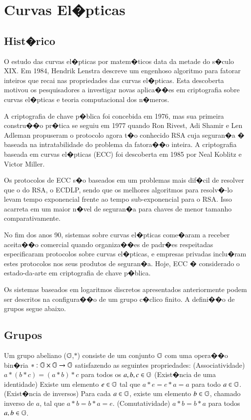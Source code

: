\documentclass[a4paper,capchap,espacoduplo,normaltoc]{abntepusp}
\begin{document}
\section{Curvas El�pticas}

\subsection{Hist�rico}
O estudo das curvas el�pticas por matem�ticos data da metade do s�culo XIX. Em 1984, Hendrik Lenstra\cite{lenstra} descreve um engenhoso algoritmo para fatorar inteiros que recai nas propriedades das curvas el�pticas. Esta descoberta motivou os pesquisadores a investigar novas aplica��es em criptografia sobre curvas el�pticas e teoria computacional dos n�meros.

A criptografia de chave p�blica foi concebida em 1976, mas sua primeira constru��o pr�tica se seguiu em 1977 quando Ron Rivest, Adi Shamir e Len Adleman propuseram o protocolo agora t�o conhecido RSA \cite{rsa} cuja seguran�a � baseada na intratabilidade do problema da fatora��o inteira. A criptografia baseada em curvas el�pticas (ECC) foi descoberta em 1985 por Neal Koblitz e Victor Miller.

Os protocolos de ECC s�o baseados em um problemas mais dif�cil de resolver que o do RSA, o ECDLP, sendo que os melhores algoritmos para resolv�-lo levam tempo exponencial frente ao tempo sub-exponencial para o RSA. Isso acarreta em um maior n�vel de seguran�a para chaves de menor tamanho comparativamente.

No fim dos anos 90, sistemas sobre curvas el�pticas come�aram a receber aceita��o comercial quando organiza��es de padr�es respeitadas especificaram protocolos sobre curvas el�pticas, e empresas privadas inclu�ram estes protocolos nos seus produtos de seguran�a. Hoje, ECC � considerado o estado-da-arte em criptografia de chave p�blica.

Os sistemas baseados em logaritmos discretos apresentados anteriormente podem ser descritos na configura��o de um grupo c�clico finito. A defini��o de grupos segue abaixo.

\subsection{Grupos}

Um grupo abeliano ($\mathbb{G}$,$*$) consiste de um conjunto $\mathbb{G}$ com uma opera��o bin�ria $* : \mathbb{G} \times \mathbb{G} \rightarrow \mathbb{G}$ satisfazendo as seguintes propriedades:
	(Associatividade) $a*(b*c) = (a*b)*c$ para todos os $a,b,c \in \mathbb{G}$
	(Exist�ncia de uma identidade) Existe um elemento $e \in \mathbb{G}$ tal que $a*e = e*a = a$ para todo $a \in \mathbb{G}$.
	(Exist�ncia de inversos) Para cada $a \in \mathbb{G}$, existe um elemento $b \in \mathbb{G}$, chamado inverso de $a$, tal que $a*b = b*a = e$.
	(Comutatividade) $a*b = b*a$ para todos $a,b \in \mathbb{G}$.
\end{document}
